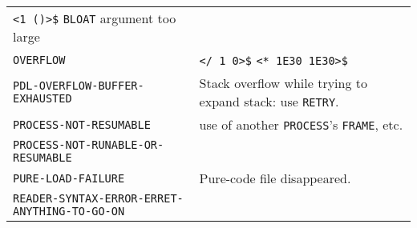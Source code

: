 \documentclass[a4paper,]{article}
\begin{document}
\begin{longtable}[]{@{}ll@{}}
\begin{minipage}[t]{0.36\columnwidth}
\texttt{\textless{}1\ \textquotesingle{}()\textgreater{}\$} \texttt{BLOAT} argument too large\strut
\end{minipage}\tabularnewline
\begin{minipage}[t]{0.58\columnwidth}\raggedright\strut
\texttt{OVERFLOW}\strut
\end{minipage} & \begin{minipage}[t]{0.36\columnwidth}\raggedright\strut
\texttt{\textless{}/\ 1\ 0\textgreater{}\$} \texttt{\textless{}*\ 1E30\ 1E30\textgreater{}\$}\strut
\end{minipage}\tabularnewline
\begin{minipage}[t]{0.58\columnwidth}\raggedright\strut
\texttt{PDL-OVERFLOW-BUFFER-EXHAUSTED}\strut
\end{minipage} & \begin{minipage}[t]{0.36\columnwidth}\raggedright\strut
Stack overflow while trying to expand stack: use \texttt{RETRY}.\strut
\end{minipage}\tabularnewline
\begin{minipage}[t]{0.58\columnwidth}\raggedright\strut
\texttt{PROCESS-NOT-RESUMABLE}\strut
\end{minipage} & \begin{minipage}[t]{0.36\columnwidth}\raggedright\strut
use of another \texttt{PROCESS}'s \texttt{FRAME}, etc.\strut
\end{minipage}\tabularnewline
\begin{minipage}[t]{0.58\columnwidth}\raggedright\strut
\texttt{PROCESS-NOT-RUNABLE-OR-RESUMABLE}\strut
\end{minipage} & \begin{minipage}[t]{0.36\columnwidth}\raggedright\strut
\strut
\end{minipage}\tabularnewline
\begin{minipage}[t]{0.58\columnwidth}\raggedright\strut
\texttt{PURE-LOAD-FAILURE}\strut
\end{minipage} & \begin{minipage}[t]{0.36\columnwidth}\raggedright\strut
Pure-code file disappeared.\strut
\end{minipage}\tabularnewline
\begin{minipage}[t]{0.58\columnwidth}\raggedright\strut
\texttt{READER-SYNTAX-ERROR-ERRET-ANYTHING-TO-GO-ON}\strut
\end{minipage} & \begin{minipage}[t]{0.36\columnwidth}\raggedright\strut
\strut
\end{minipage}\tabularnewline

\end{longtable}
\end{document}
